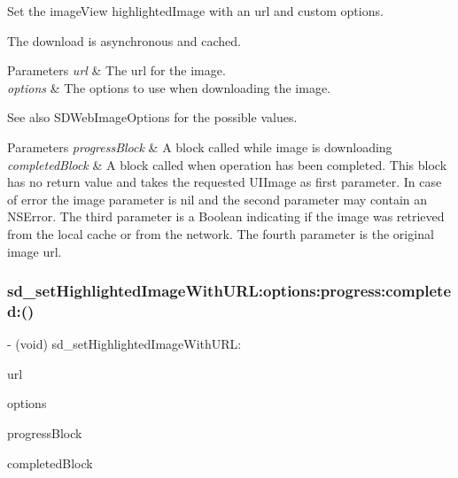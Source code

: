 Set the image\+View {\ttfamily highlighted\+Image} with an {\ttfamily url} and custom options.

The download is asynchronous and cached.


\begin{DoxyParams}{Parameters}
{\em url} & The url for the image. \\
\hline
{\em options} & The options to use when downloading the image. \\
\hline
\end{DoxyParams}
\begin{DoxySeeAlso}{See also}
S\+D\+Web\+Image\+Options for the possible values. 
\end{DoxySeeAlso}

\begin{DoxyParams}{Parameters}
{\em progress\+Block} & A block called while image is downloading \\
\hline
{\em completed\+Block} & A block called when operation has been completed. This block has no return value and takes the requested U\+I\+Image as first parameter. In case of error the image parameter is nil and the second parameter may contain an N\+S\+Error. The third parameter is a Boolean indicating if the image was retrieved from the local cache or from the network. The fourth parameter is the original image url. \\
\hline
\end{DoxyParams}
\mbox{\label{category_u_i_image_view_07_highlighted_web_cache_08_a06bdae01c3cfc17896de4b8d3c33702d}} 
\subsubsection{\texorpdfstring{sd\+\_\+set\+Highlighted\+Image\+With\+U\+R\+L\+:options\+:progress\+:completed\+:()}{sd\_setHighlightedImageWithURL:options:progress:completed:()}\hspace{0.1cm}{\footnotesize\ttfamily [2/3]}}
{\footnotesize\ttfamily -\/ (void) sd\+\_\+set\+Highlighted\+Image\+With\+U\+R\+L\+: \begin{DoxyParamCaption}\item[{(N\+S\+U\+RL $\ast$)}]{url }\item[{options:(S\+D\+Web\+Image\+Options)}]{options }\item[{progress:(S\+D\+Web\+Image\+Downloader\+Progress\+Block)}]{progress\+Block }\item[{completed:(S\+D\+Web\+Image\+Completion\+Block)}]{completed\+Block }\end{DoxyParamCaption}}

